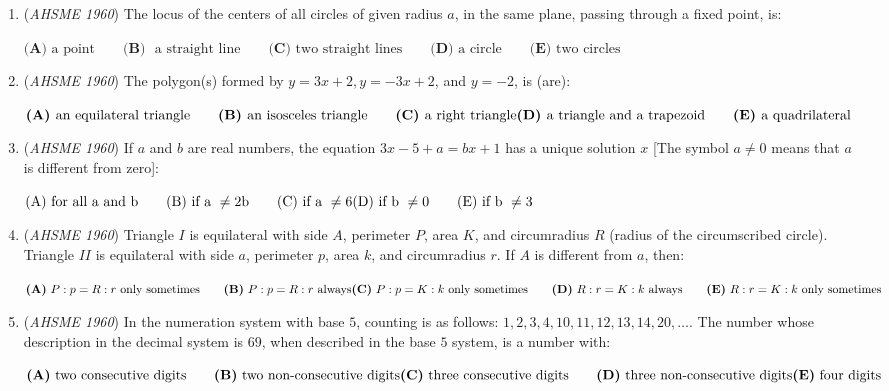 \begin{enumerate}
	\item (\textit{AHSME 1960}) The locus of the centers of all circles of given radius $a$, in the same plane, passing through a fixed point, is:


 $\textbf{(A) }\text{a point}\qquad \textbf{(B) }\text{ a straight line}\qquad \textbf{(C) }\text{two straight lines}\qquad \textbf{(D) }\text{a circle}\qquad  \textbf{(E) }\text{two circles}$


	\item (\textit{AHSME 1960}) The polygon(s) formed by $y=3x+2, y=-3x+2$, and $y=-2$, is (are):


 $\textbf{(A) }\text{an equilateral triangle}\qquad\textbf{(B) }\text{an isosceles triangle} \qquad\textbf{(C) }\text{a right triangle} \qquad \\ \textbf{(D) }\text{a triangle and a trapezoid}\qquad\textbf{(E) }\text{a quadrilateral}$


	\item (\textit{AHSME 1960}) If $a$ and $b$ are real numbers, the equation $3x-5+a=bx+1$ has a unique solution $x$ [The symbol $a \neq 0$ means that $a$ is different from zero]:


 $\text{(A) for all a and b} \qquad \text{(B) if a }\neq\text{2b}\qquad \text{(C) if a }\neq 6\qquad \\ \text{(D) if b }\neq 0\qquad \text{(E) if b }\neq 3$


	\item (\textit{AHSME 1960}) Triangle $I$ is equilateral with side $A$, perimeter $P$, area $K$, and circumradius $R$ (radius of the circumscribed circle). 
Triangle $II$ is equilateral with side $a$, perimeter $p$, area $k$, and circumradius $r$. If $A$ is different from $a$, then: 


 $\textbf{(A)}\ P:p = R:r \text{ } \text{only sometimes} \qquad \textbf{(B)}\ P:p = R:r \text{ } \text{always}\qquad \\ \textbf{(C)}\ P:p = K:k \text{ } \text{only sometimes} \qquad \textbf{(D)}\ R:r = K:k \text{ } \text{always}\qquad \textbf{(E)}\ R:r = K:k \text{ } \text{only sometimes}$


	\item (\textit{AHSME 1960}) In the numeration system with base $5$, counting is as follows: $1, 2, 3, 4, 10, 11, 12, 13, 14, 20,\ldots$.
The number whose description in the decimal system is $69$, when described in the base $5$ system, is a number with:


 $\textbf{(A)}\ \text{two consecutive digits} \qquad\textbf{(B)}\ \text{two non-consecutive digits} \qquad \\ \textbf{(C)}\ \text{three consecutive digits} \qquad\textbf{(D)}\ \text{three non-consecutive digits} \qquad \\ \textbf{(E)}\ \text{four digits}$



\end{enumerate}
